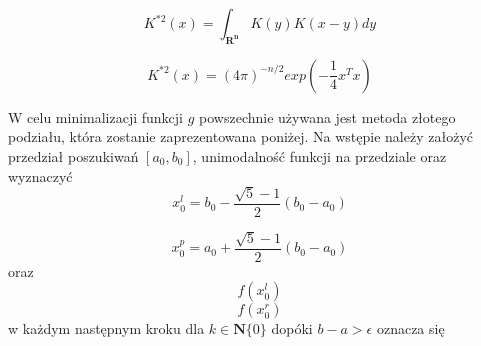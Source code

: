 \begin{equation}
K^{*2}(x) = \int_{\mathbf{R^n}}K(y)K(x-y)dy
\end{equation}

\begin{equation}
K^{*2}(x) = (4\pi)^{-n/2} exp(-\frac{1}{4}x^Tx)
\end{equation}

W celu minimalizacji funkcji $g$ powszechnie używana jest metoda złotego podziału, która zostanie zaprezentowana poniżej. Na wstępie należy założyć przedział poszukiwań $[a_0, b_0]$, unimodalność funkcji na przedziale oraz wyznaczyć
\begin{equation}
x^l_{0} = b_0 - \frac{\sqrt{5} - 1}{2}(b_0 - a_0)
\end{equation}

\begin{equation}
x^p_{0} = a_0 + \frac{\sqrt{5} - 1}{2}(b_0 - a_0)
\end{equation}
oraz 
\begin{equation}
f(x^l_{0})
\end{equation}
\begin{equation}
f(x^r_{0})
\end{equation}
w każdym następnym kroku dla $k \in \mathbf{N}\{0\}$ dopóki $b-a > \epsilon$ oznacza się

